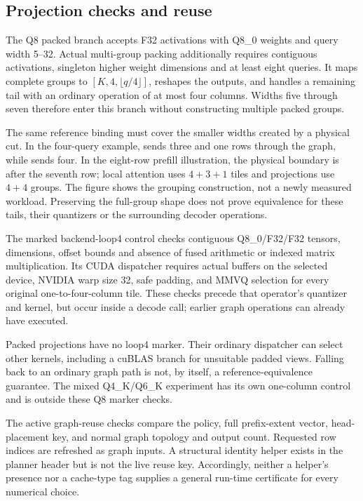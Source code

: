 \subsection{Projection checks and reuse}
The Q8 packed branch accepts F32 activations with Q8\_0 weights and query width 5--32. Actual multi-group packing additionally requires contiguous activations, singleton higher weight dimensions and at least eight queries. It maps complete groups to $[K,4,\lfloor q/4\rfloor]$, reshapes the outputs, and handles a remaining tail with an ordinary operation of at most four columns. Widths five through seven therefore enter this branch without constructing multiple packed groups.

The same reference binding must cover the smaller widths created by a physical cut. In the four-query example, \Simple{} sends three and one rows through the graph, while \Local{} sends four. In the eight-row prefill illustration, the physical boundary is after the seventh row; local attention uses $4+3+1$ tiles and projections use $4+4$ groups. The figure shows the grouping construction, not a newly measured workload. Preserving the full-group shape does not prove equivalence for these tails, their quantizers or the surrounding decoder operations.

The marked backend-loop4 control checks contiguous Q8\_0/F32/F32 tensors, dimensions, offset bounds and absence of fused arithmetic or indexed matrix multiplication. Its CUDA dispatcher requires actual buffers on the selected device, NVIDIA warp size 32, safe padding, and MMVQ selection for every original one-to-four-column tile. These checks precede that operator's quantizer and kernel, but occur inside a decode call; earlier graph operations can already have executed.

Packed projections have no loop4 marker. Their ordinary dispatcher can select other kernels, including a cuBLAS branch for unsuitable padded views. Falling back to an ordinary graph path is not, by itself, a reference-equivalence guarantee. The mixed Q4\_K/Q6\_K experiment has its own one-column control and is outside these Q8 marker checks.

The active graph-reuse checks compare the policy, full prefix-extent vector, head-placement key, and normal graph topology and output count. Requested row indices are refreshed as graph inputs. A structural identity helper exists in the planner header but is not the live reuse key. Accordingly, neither a helper's presence nor a cache-type tag supplies a general run-time certificate for every numerical choice.

